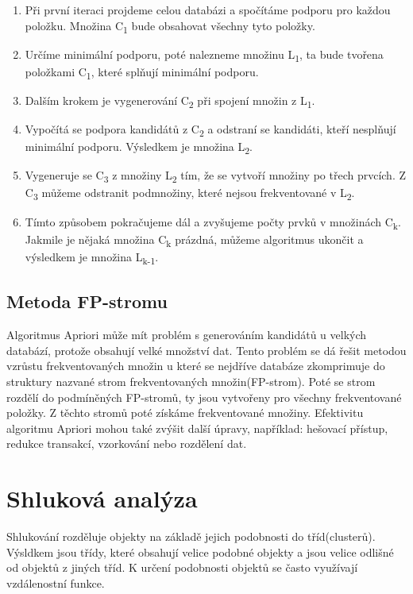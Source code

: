 \begin{enumerate}
  \item Při první iteraci projdeme celou databázi a spočítáme podporu pro každou položku. Množina C\textsubscript{1} bude obsahovat všechny tyto položky.
  \item  Určíme minimální podporu, poté nalezneme množinu L\textsubscript{1}, ta bude tvořena položkami C\textsubscript{1}, které splňují minimální podporu.
  \item Dalším krokem je vygenerování C\textsubscript{2} při spojení množin z L\textsubscript{1}.
  \item Vypočítá se podpora kandidátů z C\textsubscript{2} a odstraní se kandidáti, kteří nesplňují minimální podporu. Výsledkem je množina L\textsubscript{2}.
  \item Vygeneruje se C\textsubscript{3} z množiny L\textsubscript{2} tím, že se vytvoří množiny po třech prvcích. Z C\textsubscript{3} můžeme odstranit podmnožiny, které nejsou frekventované v L\textsubscript{2}.
  \item Tímto způsobem pokračujeme dál a zvyšujeme počty prvků v množinách C\textsubscript{k}. Jakmile je nějaká množina C\textsubscript{k} prázdná, můžeme algoritmus ukončit a výsledkem je množina L\textsubscript{k-1}.
\end{enumerate}

\subsection{Metoda FP-stromu}

Algoritmus Apriori může mít problém s generováním kandidátů u velkých databází, protože obsahují velké množství dat. Tento problém se dá řešit metodou vzrůstu frekventovaných množin u které se nejdříve databáze zkomprimuje do struktury nazvané strom frekventovaných množin(FP-strom). Poté se strom rozdělí do podmíněných FP-stromů, ty jsou vytvořeny pro všechny frekventované položky. Z těchto stromů poté získáme frekventované množiny.
Efektivitu algoritmu Apriori mohou také zvýšit další úpravy, například: hešovací přístup, redukce transakcí, vzorkování nebo rozdělení dat. \cite[Kapitola~6]{Kamber}


\section{Shluková analýza}

Shlukování rozděluje objekty na základě jejich podobnosti do tříd(clusterů). Výsldkem jsou třídy, které obsahují velice podobné objekty a jsou velice odlišné od objektů z jiných tříd. K určení podobnosti objektů se často využívají vzdálenostní funkce. \cite[Kapitola~10]{Kamber}

